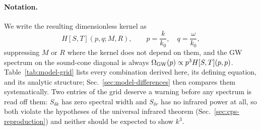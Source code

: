 \documentclass[10pt,prd,aps,nobibnotes,superscriptaddress,preprintnumbers,notitlepage]{revtex4-1}
\begin{document}
\paragraph{Notation.} We write the resulting dimensionless kernel as
\begin{equation}
  H[S,T](p,q;M,R),
  \qquad p=\frac{k}{k_0},\quad q=\frac{\omega}{k_0},
  \label{eq:kernel-notation}
\end{equation}
suppressing $M$ or $R$ where the kernel does not depend on them, and the GW
spectrum on the sound-cone diagonal is always
$\Omega_{\rm GW}(p)\propto p^{3}H[S,T](p,p)$. Table~\ref{tab:model-grid} lists
every combination derived here, its defining equation, and its analytic
structure; Sec.~\ref{sec:model-differences} then compares them systematically.
Two entries of the grid deserve a warning before any spectrum is read off them:
$S_{\delta k}$ has zero spectral width and $S_{\delta r}$ has no infrared power
at all, so both violate the hypotheses of the universal infrared theorem
(Sec.~\ref{sec:cps-reproduction}) and neither should be expected to show $k^{3}$.
\end{document}
